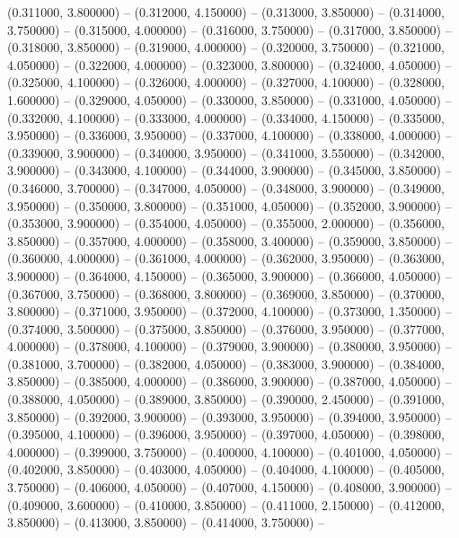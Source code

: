 (0.311000, 3.800000) -- 
(0.312000, 4.150000) -- 
(0.313000, 3.850000) -- 
(0.314000, 3.750000) -- 
(0.315000, 4.000000) -- 
(0.316000, 3.750000) -- 
(0.317000, 3.850000) -- 
(0.318000, 3.850000) -- 
(0.319000, 4.000000) -- 
(0.320000, 3.750000) -- 
(0.321000, 4.050000) -- 
(0.322000, 4.000000) -- 
(0.323000, 3.800000) -- 
(0.324000, 4.050000) -- 
(0.325000, 4.100000) -- 
(0.326000, 4.000000) -- 
(0.327000, 4.100000) -- 
(0.328000, 1.600000) -- 
(0.329000, 4.050000) -- 
(0.330000, 3.850000) -- 
(0.331000, 4.050000) -- 
(0.332000, 4.100000) -- 
(0.333000, 4.000000) -- 
(0.334000, 4.150000) -- 
(0.335000, 3.950000) -- 
(0.336000, 3.950000) -- 
(0.337000, 4.100000) -- 
(0.338000, 4.000000) -- 
(0.339000, 3.900000) -- 
(0.340000, 3.950000) -- 
(0.341000, 3.550000) -- 
(0.342000, 3.900000) -- 
(0.343000, 4.100000) -- 
(0.344000, 3.900000) -- 
(0.345000, 3.850000) -- 
(0.346000, 3.700000) -- 
(0.347000, 4.050000) -- 
(0.348000, 3.900000) -- 
(0.349000, 3.950000) -- 
(0.350000, 3.800000) -- 
(0.351000, 4.050000) -- 
(0.352000, 3.900000) -- 
(0.353000, 3.900000) -- 
(0.354000, 4.050000) -- 
(0.355000, 2.000000) -- 
(0.356000, 3.850000) -- 
(0.357000, 4.000000) -- 
(0.358000, 3.400000) -- 
(0.359000, 3.850000) -- 
(0.360000, 4.000000) -- 
(0.361000, 4.000000) -- 
(0.362000, 3.950000) -- 
(0.363000, 3.900000) -- 
(0.364000, 4.150000) -- 
(0.365000, 3.900000) -- 
(0.366000, 4.050000) -- 
(0.367000, 3.750000) -- 
(0.368000, 3.800000) -- 
(0.369000, 3.850000) -- 
(0.370000, 3.800000) -- 
(0.371000, 3.950000) -- 
(0.372000, 4.100000) -- 
(0.373000, 1.350000) -- 
(0.374000, 3.500000) -- 
(0.375000, 3.850000) -- 
(0.376000, 3.950000) -- 
(0.377000, 4.000000) -- 
(0.378000, 4.100000) -- 
(0.379000, 3.900000) -- 
(0.380000, 3.950000) -- 
(0.381000, 3.700000) -- 
(0.382000, 4.050000) -- 
(0.383000, 3.900000) -- 
(0.384000, 3.850000) -- 
(0.385000, 4.000000) -- 
(0.386000, 3.900000) -- 
(0.387000, 4.050000) -- 
(0.388000, 4.050000) -- 
(0.389000, 3.850000) -- 
(0.390000, 2.450000) -- 
(0.391000, 3.850000) -- 
(0.392000, 3.900000) -- 
(0.393000, 3.950000) -- 
(0.394000, 3.950000) -- 
(0.395000, 4.100000) -- 
(0.396000, 3.950000) -- 
(0.397000, 4.050000) -- 
(0.398000, 4.000000) -- 
(0.399000, 3.750000) -- 
(0.400000, 4.100000) -- 
(0.401000, 4.050000) -- 
(0.402000, 3.850000) -- 
(0.403000, 4.050000) -- 
(0.404000, 4.100000) -- 
(0.405000, 3.750000) -- 
(0.406000, 4.050000) -- 
(0.407000, 4.150000) -- 
(0.408000, 3.900000) -- 
(0.409000, 3.600000) -- 
(0.410000, 3.850000) -- 
(0.411000, 2.150000) -- 
(0.412000, 3.850000) -- 
(0.413000, 3.850000) -- 
(0.414000, 3.750000) -- 
